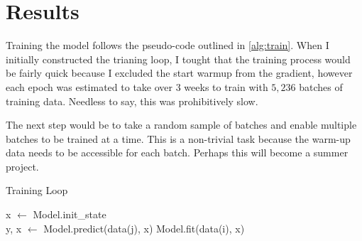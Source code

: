 \documentclass{article}
\numberwithin{equation}{subsection}
\begin{document}
\section{Results}

Training the model follows the pseudo-code outlined in \ref{alg:train}. When I initially constructed
the trianing loop, I tought that the training process would be fairly quick because I excluded the
start warmup from the gradient, however each epoch was estimated to take over 3 weeks to train with
$5,236$ batches of training data. Needless to say, this was prohibitively slow.

The next step would be to take a random sample of batches and enable multiple batches to be trained
at a time. This is a non-trivial task because the warm-up data needs to be accessible for each batch.
Perhaps this will become a summer project.

\begin{algorithm}
\caption{Training Loop} \label{alg:train}
\begin{algorithmic}
    \STATE x $\leftarrow$ Model.init\_state
    \\ 
      \STATE y, x $\leftarrow$ Model.predict(data(j), x)
    \ENDFOR
    \STATE Model.fit(data(i), x)
  \ENDFOR
\ENDFOR
\end{algorithmic}
\end{algorithm}







\ \\\ \\\  \\\  \\\  \\\  \\\  



\end{document}
